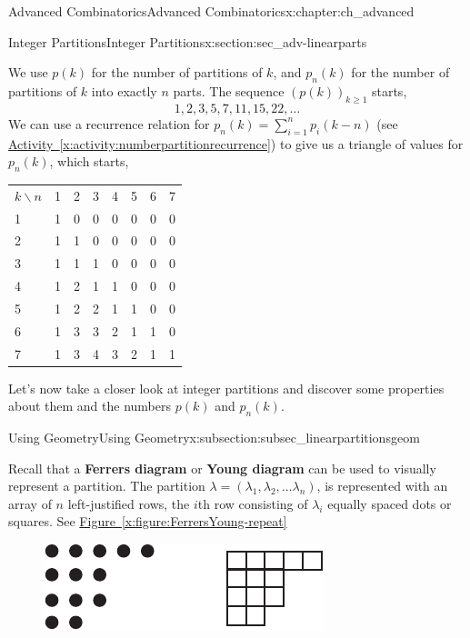 \documentclass[oneside,10pt,]{book}
\newcommand{\terminology}[1]{\textbf{#1}}
\numberwithin{equation}{chapter}
\newcommand{\hrulethin}  {\noalign{\hrule height 0.04em}}
\begin{document}
\begin{chapterptx}{Advanced Combinatorics}{}{Advanced Combinatorics}{}{}{x:chapter:ch_advanced}
\begin{sectionptx}{Integer Partitions}{}{Integer Partitions}{}{}{x:section:sec_adv-linearparts}
\begin{introduction}{}
\par
We use \(p(k)\) for the number of partitions of \(k\), and \(p_n(k)\) for the number of partitions of \(k\) into exactly \(n\) parts.  The sequence \((p(k))_{k \ge 1}\) starts,%
\begin{equation*}
1, 2, 3, 5, 7, 11, 15, 22,\ldots
\end{equation*}
We can use a recurrence relation for \(p_n(k) = \sum_{i=1}^n p_i(k-n)\) (see \hyperref[x:activity:numberpartitionrecurrence]{Activity~\ref{x:activity:numberpartitionrecurrence}}) to give us a triangle of values for \(p_n(k)\), which starts,%
\begin{sidebyside}{1}{0}{0}{0}%
\begin{sbspanel}{1}%
{\centering%
\begin{tabular}{llllllll}
\(k\backslash n\)&1&2&3&4&5&6&7\tabularnewline\hrulethin
1&1&0&0&0&0&0&0\tabularnewline[0pt]
2&1&1&0&0&0&0&0\tabularnewline[0pt]
3&1&1&1&0&0&0&0\tabularnewline[0pt]
4&1&2&1&1&0&0&0\tabularnewline[0pt]
5&1&2&2&1&1&0&0\tabularnewline[0pt]
6&1&3&3&2&1&1&0\tabularnewline[0pt]
7&1&3&4&3&2&1&1
\end{tabular}
\par}
\end{sbspanel}%
\end{sidebyside}%
\par
Let's now take a closer look at integer partitions and discover some properties about them and the numbers \(p(k)\) and \(p_n(k)\).%
\end{introduction}%
%
%
\typeout{************************************************}
\typeout{************************************************}
%
\begin{subsectionptx}{Using Geometry}{}{Using Geometry}{}{}{x:subsection:subsec_linearpartitionsgeom}
\begin{introduction}{}%
Recall that a \terminology{Ferrers diagram} or \terminology{Young diagram} can be used to visually represent a partition.  The partition \(\lambda = (\lambda_1,\lambda_2,\ldots \lambda_n)\), is represented with an array of \(n\) left-justified rows, the \(i\)th row consisting of \(\lambda_i\) equally spaced dots or squares.  See \hyperref[x:figure:FerrersYoung-repeat]{Figure~\ref{x:figure:FerrersYoung-repeat}}%
\begin{figure}
\centering
\includegraphics[width=0.45\linewidth]{images/FerrersYoung}

\end{figure}
\end{introduction}
\end{subsectionptx}
\end{sectionptx}
\end{chapterptx}
\end{document}
